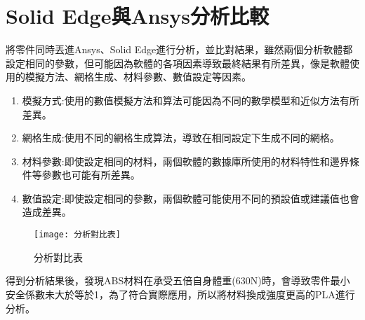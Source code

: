 \section{Solid Edge與Ansys分析比較}
將零件同時丟進Ansys、Solid Edge進行分析，並比對結果，雖然兩個分析軟體都設定相同的參數，但可能因為軟體的各項因素導致最終結果有所差異，像是軟體使用的模擬方法、網格生成、材料參數、數值設定等因素。\
\begin{enumerate}
\item 模擬方式:使用的數值模擬方法和算法可能因為不同的數學模型和近似方法有所差異。
\item 網格生成:使用不同的網格生成算法，導致在相同設定下生成不同的網格。
\item 材料參數:即使設定相同的材料，兩個軟體的數據庫所使用的材料特性和邊界條件等參數也可能有所差異。
\item	數值設定:即使設定相同的參數，兩個軟體可能使用不同的預設值或建議值也會造成差異。
\end{enumerate}
\newpage
\begin{figure}[hbt!]
\center
\texttt{[image: 分析對比表]}
\caption{\Large 分析對比表}
\label{分析對比表}
\end{figure}

\begin{table}[htb!]
  \center\large
  \caption{\Large ABS最大等效應力(MPa)}
\end{table}   

得到分析結果後，發現ABS材料在承受五倍自身體重(630N)時，會導致零件最小安全係數未大於等於1，為了符合實際應用，所以將材料換成強度更高的PLA進行分析。\\


\begin{table}[htb!]
  \center\large
  \caption{\Large PLA最大等效應力(MPa)}
\end{table}

